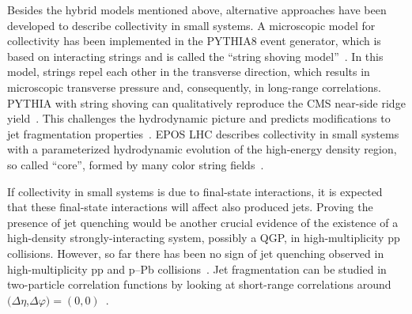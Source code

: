 Besides the hybrid models mentioned above, alternative approaches have been developed to describe collectivity in small systems. A microscopic model for collectivity has been implemented in the PYTHIA8 event generator, which is based on interacting strings and is called the “string shoving model”~\cite{Bierlich:2017vhg}. In this model, strings repel each other in the transverse direction, which results in microscopic transverse pressure and, consequently, in long-range correlations. PYTHIA with string shoving can qualitatively reproduce the CMS near-side ridge yield~\cite{Khachatryan:2016txc}. This challenges the hydrodynamic picture and predicts modifications to jet fragmentation properties~\cite{Bierlich:2019ixq}.
EPOS LHC describes collectivity in small systems with a parameterized hydrodynamic evolution of the high-energy density region, so called ``core'', formed by many color string fields~\cite{Pierog:2013ria}.

If collectivity in small systems is due to final-state interactions, it is expected 
that these final-state interactions will affect also produced jets. Proving the presence of jet quenching would be another crucial evidence of the existence of a high-density strongly-interacting system, possibly a  QGP, in high-multiplicity pp collisions. However, so far there has been no sign of jet quenching observed in high-multiplicity pp and p--Pb collisions~\cite{Khachatryan:2016odn,Adam:2016jfp,Adam:2016dau,Acharya:2017okq}. Jet fragmentation can be studied in two-particle correlation functions by looking at short-range correlations around $(\Delta\eta$,$\Delta\varphi)=(0,0)$~\cite{Adam:2016tsv}.  


% 

